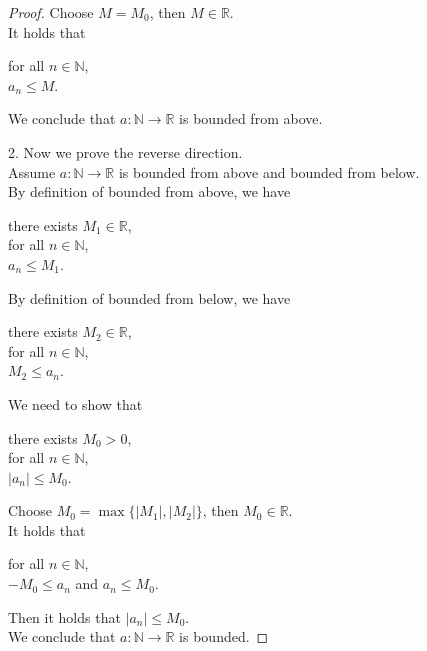 \documentclass{article}
\newcommand{\N}{\mathbb{N}}
\newcommand{\R}{\mathbb{R}}
\theoremstyle{mytheoremstyle}
\theoremstyle{mytheoremstyle}
\theoremstyle{myproblemstyle}
\begin{document}
\begin{proof}
        Choose $M = M_0$, then $M \in \R$. \\
        It holds that
        \begin{center}
            \parbox{\linewidth}{
                \linewidth
                for all $n \in \N$, \\
                \hspace*{1em} $a_n \leq M$.
            }
        \end{center}
        We conclude that $a:\N \to \R$ is bounded from above.

        2. Now we prove the reverse direction. \\
        Assume $a:\N \to \R$ is bounded from above and bounded from below. \\
        By definition of bounded from above, we have
        \begin{center}
            \parbox{\linewidth}{
                \linewidth
                there exists $M_1 \in \R$, \\
                \hspace*{1em} for all $n \in \N$, \\
                \hspace*{2em} $a_n \leq M_1$.
            }
        \end{center}

        By definition of bounded from below, we have
        \begin{center}
            \parbox{\linewidth}{
                \linewidth
                there exists $M_2 \in \R$, \\
                \hspace*{1em} for all $n \in \N$, \\
                \hspace*{2em} $M_2 \leq a_n$.
            }
        \end{center}

        We need to show that
        \begin{center}
            \parbox{\linewidth}{
                \linewidth
                there exists $M_0 > 0$, \\
                \hspace*{1em} for all $n \in \N$, \\
                \hspace*{2em} $|a_n| \leq M_0$.
            }
        \end{center}

        Choose $M_0 = \max\{|M_1|, |M_2|\}$, then $M_0 \in \R$. \\
        It holds that
        \begin{center}
            \parbox{\linewidth}{
                \linewidth
                for all $n \in \N$, \\
                \hspace*{1em} $-M_0 \leq a_n$ and $a_n \leq M_0$.
            }
        \end{center}
        Then it holds that $|a_n| \leq M_0$.\\
        We conclude that $a: \N \to \R$ is bounded.


\end{proof}
\end{document}

